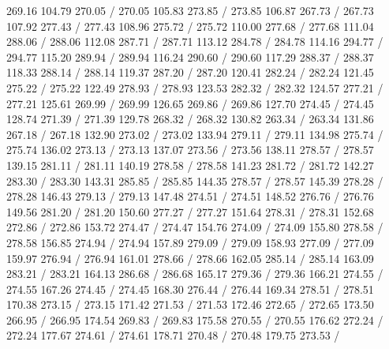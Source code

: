 { 269.16 104.79 270.05 /
 270.05 105.83 273.85 /
 273.85 106.87 267.73 /
 267.73 107.92 277.43 /
 277.43 108.96 275.72 /
 275.72 110.00 277.68 /
 277.68 111.04 288.06 /
 288.06 112.08 287.71 /
 287.71 113.12 284.78 /
 284.78 114.16 294.77 /
 294.77 115.20 289.94 /
 289.94 116.24 290.60 /
 290.60 117.29 288.37 /
 288.37 118.33 288.14 /
 288.14 119.37 287.20 /
 287.20 120.41 282.24 /
 282.24 121.45 275.22 /
 275.22 122.49 278.93 /
 278.93 123.53 282.32 /
 282.32 124.57 277.21 /
 277.21 125.61 269.99 /
 269.99 126.65 269.86 /
 269.86 127.70 274.45 /
 274.45 128.74 271.39 /
 271.39 129.78 268.32 /
 268.32 130.82 263.34 /
 263.34 131.86 267.18 /
 267.18 132.90 273.02 /
 273.02 133.94 279.11 /
 279.11 134.98 275.74 /
 275.74 136.02 273.13 /
 273.13 137.07 273.56 /
 273.56 138.11 278.57 /
 278.57 139.15 281.11 /
 281.11 140.19 278.58 /
 278.58 141.23 281.72 /
 281.72 142.27 283.30 /
 283.30 143.31 285.85 /
 285.85 144.35 278.57 /
 278.57 145.39 278.28 /
 278.28 146.43 279.13 /
 279.13 147.48 274.51 /
 274.51 148.52 276.76 /
 276.76 149.56 281.20 /
 281.20 150.60 277.27 /
 277.27 151.64 278.31 /
 278.31 152.68 272.86 /
 272.86 153.72 274.47 /
 274.47 154.76 274.09 /
 274.09 155.80 278.58 /
 278.58 156.85 274.94 /
 274.94 157.89 279.09 /
 279.09 158.93 277.09 /
 277.09 159.97 276.94 /
 276.94 161.01 278.66 /
 278.66 162.05 285.14 /
 285.14 163.09 283.21 /
 283.21 164.13 286.68 /
 286.68 165.17 279.36 /
 279.36 166.21 274.55 /
 274.55 167.26 274.45 /
 274.45 168.30 276.44 /
 276.44 169.34 278.51 /
 278.51 170.38 273.15 /
 273.15 171.42 271.53 /
 271.53 172.46 272.65 /
 272.65 173.50 266.95 /
 266.95 174.54 269.83 /
 269.83 175.58 270.55 /
 270.55 176.62 272.24 /
 272.24 177.67 274.61 /
 274.61 178.71 270.48 /
 270.48 179.75 273.53 /
}
